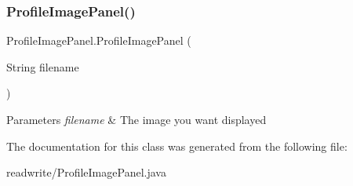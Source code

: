 \subsubsection{\texorpdfstring{Profile\+Image\+Panel()}{ProfileImagePanel()}}
{\footnotesize\ttfamily Profile\+Image\+Panel.\+Profile\+Image\+Panel (\begin{DoxyParamCaption}\item[{String}]{filename }\end{DoxyParamCaption})}


\begin{DoxyParams}{Parameters}
{\em filename} & The image you want displayed \\
\hline
\end{DoxyParams}


The documentation for this class was generated from the following file\+:\begin{DoxyCompactItemize}
\item 
readwrite/Profile\+Image\+Panel.\+java\end{DoxyCompactItemize}
